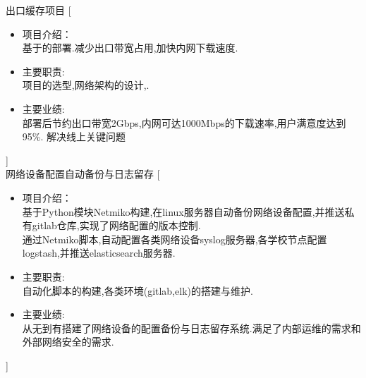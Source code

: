 \documentclass[zh]{resume}
\begin{document}
\begin{experiences}
  {出口缓存项目}%
  [\begin{itemize}
    \item 项目介绍：\\
    基于的部署.减少出口带宽占用,加快内网下载速度.
    \item 主要职责: \\
    项目的选型,网络架构的设计,.
    \item 主要业绩: \\
    部署后节约出口带宽2Gbps,内网可达1000Mbps的下载速率,用户满意度达到95\%. 解决线上关键问题
  \end{itemize}]
  \\
  {网络设备配置自动备份与日志留存}%
  [\begin{itemize}
    \item 项目介绍：\\
    基于Python模块Netmiko构建,在linux服务器自动备份网络设备配置,并推送私有gitlab仓库,实现了网络配置的版本控制.\\
    通过Netmiko脚本,自动配置各类网络设备syslog服务器,各学校节点配置logstash,并推送elasticsearch服务器.
    \item 主要职责: \\
    自动化脚本的构建,各类环境(gitlab,elk)的搭建与维护.
    \item 主要业绩: \\
    从无到有搭建了网络设备的配置备份与日志留存系统.满足了内部运维的需求和外部网络安全的需求.
  \end{itemize}]
\end{experiences}
\end{document}
